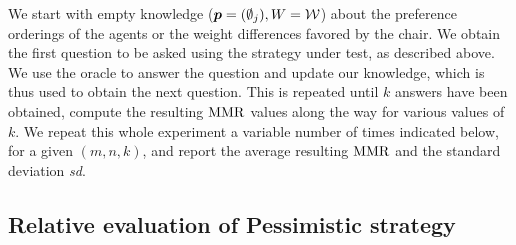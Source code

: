 \documentclass[sigconf, anonymous]{aamas}
\begin{document}
We start with empty knowledge (${\bm{p}} = (\emptyset_j), W = \mathcal{W}$) about the preference orderings of the agents or the weight differences favored by the chair. We obtain the first question to be asked using the strategy under test, as described above. We use the oracle to answer the question and update our knowledge, which is thus used to obtain the next question. This is repeated until $k$ answers have been obtained, compute the resulting $\operatorname{MMR}$ values along the way for various values of $k$. We repeat this whole experiment a variable number of times indicated below, for a given $(m, n, k)$, and report the average resulting $\operatorname{MMR}$ and the standard deviation \textit{sd}.

\subsection{Relative evaluation of Pessimistic strategy}
\begin{table}
	\begin{center}
	\end{center}
	\caption{Average MMR in problems of size $(5, 10)$ after $k$ questions and $200$ runs.}
	\label{tab:smallSize}
\end{table}
\end{document}
